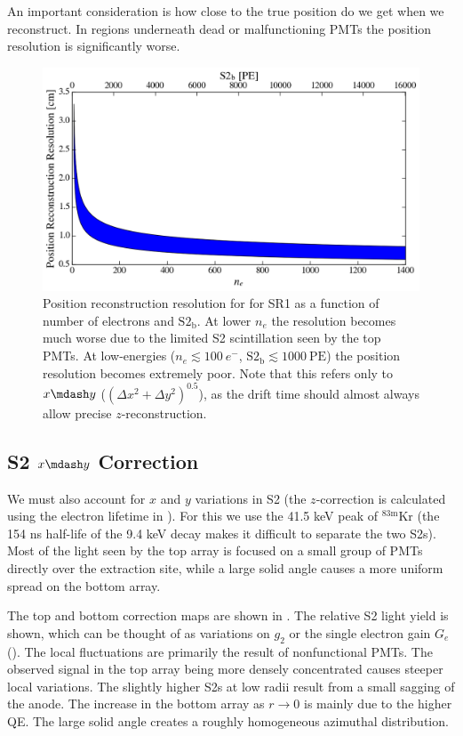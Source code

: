 An important consideration is how close to the true position do we get when we reconstruct.  In regions underneath dead or malfunctioning
PMTs the position resolution is significantly worse.

\begin{figure}
\centering
\includegraphics[width=\textwidth]{PosRecRes}
\caption{Position reconstruction resolution for for SR1 as a function of number of electrons and $\mathrm{S2_b}$.  At lower $n_e$ the
resolution becomes much worse due to the limited S2 scintillation seen by the top PMTs.  At low-energies ($n_e \lesssim 100\ e^-$,
$\mathrm{S2_b} \lesssim 1000\ \mathrm{PE}$) the position resolution becomes extremely poor.  Note that this refers only to $x \mdash y$
($(\Delta x^2 + \Delta y^2)^{0.5}$), as the drift time should almost always allow precise $z$-reconstruction.}
\label{fig:calibrations_position_reconstruction_res}
\end{figure}



\subsection{S2 $x \mdash y$ Correction}
\label{subsec:det_char_s2_position_correction}
We must also account for $x$ and $y$ variations in S2 (the $z$-correction is calculated using the electron lifetime in
).  For
this we use the 41.5 keV peak of $\mathrm{^{83m}Kr}$ (the 154 ns half-life of the 9.4 keV decay makes it difficult to separate the two
S2s).  Most of the light seen by the top array is focused on a small group of PMTs directly over the extraction site, while a large
solid angle causes a more uniform spread on the bottom array.

The top and bottom correction maps are shown in .  The relative S2 light yield is shown, which can be
thought of as variations on $g_2$ or the single electron gain $G_e$ ().  The local
fluctuations are primarily the result
of nonfunctional PMTs.  The observed signal in the top array being more densely concentrated causes steeper local variations.  The
slightly higher S2s at low radii result from a small sagging of the anode.  The increase in the bottom array as $r \rightarrow 0$ is 
mainly due to the higher QE.  The large solid angle creates a roughly homogeneous azimuthal distribution.

